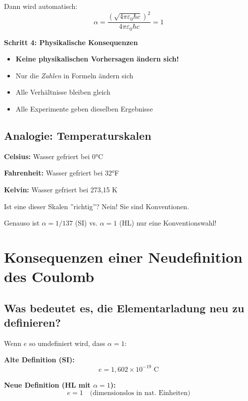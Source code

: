 	Dann wird automatisch:
	\begin{equation}
		\alpha = \frac{(\sqrt{4\pi\varepsilon_0\hbar c})^2}{4\pi\varepsilon_0\hbar c} = 1
	\end{equation}
	
	\textbf{Schritt 4: Physikalische Konsequenzen}
	
	\begin{itemize}
		\item \textbf{Keine physikalischen Vorhersagen ändern sich!}
		\item Nur die \textit{Zahlen} in Formeln ändern sich
		\item Alle Verhältnisse bleiben gleich
		\item Alle Experimente geben dieselben Ergebnisse
	\end{itemize}
	
	\subsection{Analogie: Temperaturskalen}
	
	\textbf{Celsius:} Wasser gefriert bei 0°C
	
	\textbf{Fahrenheit:} Wasser gefriert bei 32°F
	
	\textbf{Kelvin:} Wasser gefriert bei 273{,}15 K
	
	Ist eine dieser Skalen ''richtig''? Nein! Sie sind Konventionen.
	
	Genauso ist $\alpha = 1/137$ (SI) vs. $\alpha = 1$ (HL) nur eine Konventionswahl!
	
	\section{Konsequenzen einer Neudefinition des Coulomb}
	
	\subsection{Was bedeutet es, die Elementarladung neu zu definieren?}
	
	Wenn $e$ so umdefiniert wird, dass $\alpha = 1$:
	
	\textbf{Alte Definition (SI):}
	\begin{equation}
		e = 1{,}602 \times 10^{-19} \text{ C}
	\end{equation}
	
	\textbf{Neue Definition (HL mit $\alpha = 1$):}
	\begin{equation}
		e = 1 \quad \text{(dimensionslos in nat. Einheiten)}
	\end{equation}
	
